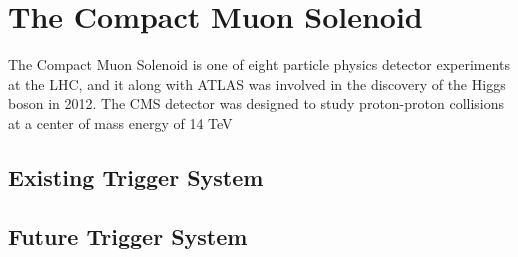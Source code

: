 
\chapter{The Compact Muon Solenoid}
The Compact Muon Solenoid is one of eight particle physics detector experiments at the LHC, and it along with ATLAS was involved in the discovery of the Higgs boson in 2012. The CMS detector was designed to study proton-proton collisions at a center of mass energy of 14 TeV

\section{Existing Trigger System}

\section{Future Trigger System}
